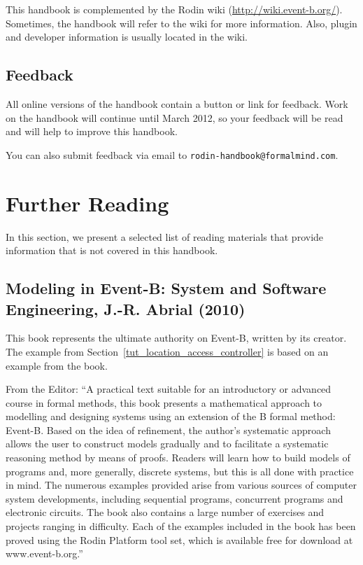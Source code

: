 \documentclass[12pt]{book}
\begin{document}
This handbook is complemented by the Rodin wiki (\url{http://wiki.event-b.org/}).  Sometimes, the handbook will refer to the wiki for more information.  Also, plugin and developer information is usually located in the wiki.

\subsection{Feedback}
\label{feedback}

All online versions of the handbook contain a button or link for feedback.  Work on the handbook will continue until March 2012, so your feedback will be read and will help to improve this handbook.

You can also submit feedback via email to \texttt{rodin-hand\-book@formal\-mind.com}.

\section{Further Reading}
\label{literature}

In this section, we present a selected list of reading materials that provide information that is not covered in this handbook.

\subsection{Modeling in Event-B: System and Software Engineering, J.-R. Abrial (2010)}
\label{abrial_2010}

This book represents the ultimate authority on Event-B, written by its creator.  The example from Section~\ref{tut_location_access_controller} is based on an example from the book.

From the Editor: ``A practical text suitable for an introductory or advanced course in formal methods, this book presents a mathematical approach to modelling and designing systems using an extension of the B formal method: Event-B. Based on the idea of refinement, the author's systematic approach allows the user to construct models gradually and to facilitate a systematic reasoning method by means of proofs. Readers will learn how to build models of programs and, more generally, discrete systems, but this is all done with practice in mind. The numerous examples provided arise from various sources of computer system developments, including sequential programs, concurrent programs and electronic circuits. The book also contains a large number of exercises and projects ranging in difficulty. Each of the examples included in the book has been proved using the Rodin Platform tool set, which is available free for download at www.event-b.org.''
\end{document}
